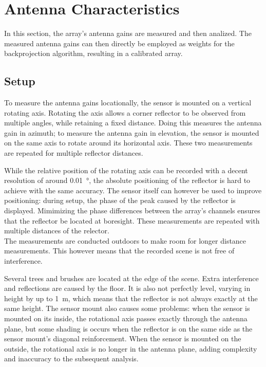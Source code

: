 \section{Antenna Characteristics}
\label{sec:calibration}

In this section, the array's antenna gains are measured and then analized.
The measured antenna gains can then directly be employed as weights for the backprojection algorithm,
resulting in a calibrated array.

\subsection{Setup}
To measure the antenna gains locationally, the sensor is mounted on a vertical rotating axis.
Rotating the axis allows a corner reflector to be observed from multiple angles, while retaining a fixed distance.
Doing this measures the antenna gain in azimuth;
to measure the antenna gain in elevation, the sensor is mounted on the same axis to rotate around its horizontal axis.
These two measurements are repeated for multiple reflector distances.

While the relative position of the rotating axis can be recorded with a decent resolution of around \SI{0.01}{\degree},
the absolute positioning of the reflector is hard to achieve with the same accuracy.
The sensor itself can however be used to improve positioning:
during setup, the phase of the peak caused by the reflector is displayed.
Mimimizing the phase differences between the array's channels ensures that the reflector be located at boresight.
These measurements are repeated with multiple distances of the relector.\\

The measurements are conducted outdoors to make room for longer distance measurements.
This however means that the recorded scene is not free of interference.

Several trees and brushes are located at the edge of the scene.
Extra interference and reflections are caused by the floor.
It is also not perfectly level, varying in height by up to \SI{1}{\meter},
which means that the reflector is not always exactly at the same height.
The sensor mount also causes some problems:
when the sensor is mounted on its inside,
the rotational axis passes exactly through the antenna plane,
but some shading is occurs when the reflector is on the same side as the sensor mount's diagonal reinforcement.
When the sensor is mounted on the outside,
the rotational axis is no longer in the antenna plane,
adding complexity and inaccuracy to the subsequent analysis.

